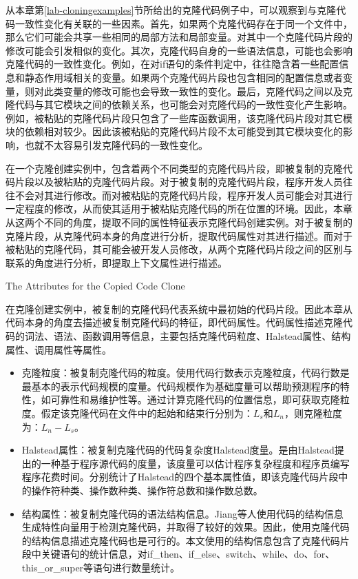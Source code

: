 从本章第\ref{lab-cloningexamples}节所给出的克隆代码例子中，可以观察到与克隆代码一致性变化有关联的一些因素。首先，如果两个克隆代码存在于同一个文件中，那么它们可能会共享一些相同的局部方法和局部变量。对其中一个克隆代码片段的修改可能会引发相似的变化。其次，克隆代码自身的一些语法信息，可能也会影响克隆代码的一致性变化。例如，在对{if}语句的条件判定中，往往隐含着一些配置信息和静态作用域相关的变量。如果两个克隆代码片段也包含相同的配置信息或者变量，则对此类变量的修改可能也会导致一致性的变化。最后，克隆代码之间以及克隆代码与其它模块之间的依赖关系，也可能会对克隆代码的一致性变化产生影响。例如，被粘贴的克隆代码片段只包含了一些库函数调用，该克隆代码片段对其它模块的依赖相对较少。因此该被粘贴的克隆代码片段不太可能受到其它模块变化的影响，也就不太容易引发克隆代码的一致性变化。

在一个克隆创建实例中，包含着两个不同类型的克隆代码片段，即被复制的克隆代码片段以及被粘贴的克隆代码片段。对于被复制的克隆代码片段，程序开发人员往往不会对其进行修改。而对被粘贴的克隆代码片段，程序开发人员可能会对其进行一定程度的修改，从而使其适用于被粘贴克隆代码的所在位置的环境。因此，本章从这两个不同的角度，提取不同的属性特征表示克隆代码创建实例。对于被复制的克隆片段，从克隆代码本身的角度进行分析，提取代码属性对其进行描述。而对于被粘贴的克隆代码，其可能会被开发人员修改，从两个克隆代码片段之间的区别与联系的角度进行分析，即提取上下文属性进行描述。

{The Attributes for the Copied Code Clone}

在克隆创建实例中，被复制的克隆代码代表系统中最初始的代码片段。因此本章从代码本身的角度去描述被复制克隆代码的特征，即代码属性。代码属性描述克隆代码的词法、语法、函数调用等信息，主要包括克隆代码粒度、Halstead属性、结构属性、调用属性等属性。

\begin{itemize}
\item 
克隆粒度：被复制克隆代码的粒度。使用代码行数表示克隆粒度，代码行数是最基本的表示代码规模的度量。代码规模作为基础度量可以帮助预测程序的特性，如可靠性和易维护性等\cite{ramamoorthy1984software}。通过计算克隆代码的位置信息，即可获取克隆粒度。假定该克隆代码在文件中的起始和结束行分别为：$L_s$和$L_n$，则克隆粒度为：{$L_n - L_s$}。
\item 
Halstead属性：被复制克隆代码的代码复杂度Halstead度量\cite{jones1994software}。是由Halstead提出的一种基于程序源代码的度量，该度量可以估计程序复杂程度和程序员编写程序花费时间。分别统计了Halstead的四个基本属性值，即该克隆代码片段中的操作符种类、操作数种类、操作符总数和操作数总数。
\item  
结构属性：被复制克隆代码的语法结构信息。Jiang等人使用代码的结构信息生成特性向量用于检测克隆代码，并取得了较好的效果\cite{jiang2007deckard}。因此，使用克隆代码的结构信息描述克隆代码也是可行的。本文使用的结构信息包含了克隆代码片段中关键语句的统计信息，对{if\_then、if\_else、switch、while、do、for、this\_or\_super}等语句进行数量统计。
\end{itemize}

